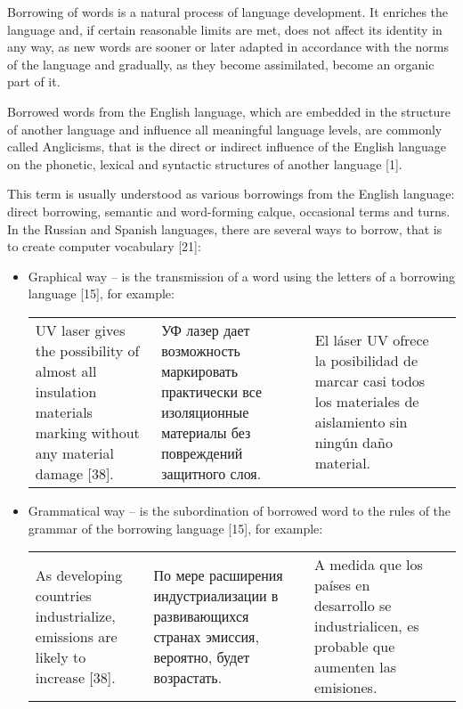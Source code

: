 \documentclass[12pt, a4paper, twoside]{report}
\begin{document}
Borrowing of words is a natural process of language development. It enriches the language and, if certain reasonable limits are met, does not affect its identity in any way, as new words are sooner or later adapted in accordance with the norms of the language and gradually, as they become assimilated, become an organic part of it.

Borrowed words from the English language, which are embedded in the structure of another language and influence all meaningful language levels, are commonly called Anglicisms, that is the direct or indirect influence of the English language on the phonetic, lexical and syntactic structures of another language [1].

This term is usually understood as various borrowings from the English language: direct borrowing, semantic and word-forming calque, occasional terms and turns.\\

In the Russian and Spanish languages, there are several ways to borrow, that is to create computer vocabulary [21]:\\

\begin{itemize}
    \item Graphical way – is the transmission of a word using the letters of a borrowing language [15], for example:\\
    
    \begin{table}[H]
        \centering
        \begin{tabular}{ | m{3cm} | m{3cm}| m{3cm} | m{3cm} | } 
            UV laser gives the possibility of almost all insulation materials marking without any material damage [38]. &  УФ лазер дает возможность маркировать практически все изоляционные материалы без повреждений защитного слоя. & El láser UV ofrece la posibilidad de marcar casi todos los materiales de aislamiento sin ningún daño material. \\ 
        \end{tabular}
    \end{table}
\end{itemize}

\begin{itemize}
    \item Grammatical way – is the subordination of borrowed word to the rules of the grammar of the borrowing language [15], for example:\\
    
    \begin{table}[H]
        \centering
        \begin{tabular}{ | m{3cm} | m{3cm}| m{3cm} | m{3cm} | } 
            As developing countries industrialize, emissions are likely to increase [38]. &  По мере расширения индустриализации в развивающихся странах эмиссия, вероятно, будет возрастать. & A medida que los países en desarrollo se industrialicen, es probable que aumenten las emisiones. \\ 
        \end{tabular}
    \end{table}
\end{itemize}
\end{document}

